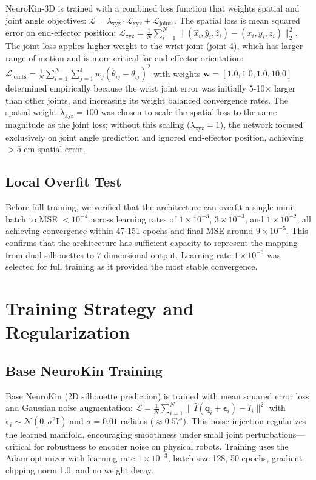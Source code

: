 \documentclass[12pt,a4paper,oneside]{report}
\begin{document}
NeuroKin-3D is trained with a combined loss function that weights spatial and joint angle objectives: $\mathcal{L} = \lambda_{\text{xyz}} \cdot \mathcal{L}_{\text{xyz}} + \mathcal{L}_{\text{joints}}$. The spatial loss is mean squared error on end-effector position: $\mathcal{L}_{\text{xyz}} = \frac{1}{N} \sum_{i=1}^{N} \|(\hat{x}_i, \hat{y}_i, \hat{z}_i) - (x_i, y_i, z_i)\|_2^2$. The joint loss applies higher weight to the wrist joint (joint 4), which has larger range of motion and is more critical for end-effector orientation: $\mathcal{L}_{\text{joints}} = \frac{1}{N} \sum_{i=1}^{N} \sum_{j=1}^{4} w_j (\hat{\theta}_{ij} - \theta_{ij})^2$ with weights $\mathbf{w} = [1.0, 1.0, 1.0, 10.0]$ determined empirically because the wrist joint error was initially 5-10$\times$ larger than other joints, and increasing its weight balanced convergence rates. The spatial weight $\lambda_{\text{xyz}} = 100$ was chosen to scale the spatial loss to the same magnitude as the joint loss; without this scaling ($\lambda_{\text{xyz}} = 1$), the network focused exclusively on joint angle prediction and ignored end-effector position, achieving $>5$ cm spatial error.

\subsection{Local Overfit Test}
\label{subsec:local_overfit_test}

Before full training, we verified that the architecture can overfit a single mini-batch to MSE $< 10^{-4}$ across learning rates of $1 \times 10^{-3}$, $3 \times 10^{-3}$, and $1 \times 10^{-2}$, all achieving convergence within 47-151 epochs and final MSE around $9 \times 10^{-5}$. This confirms that the architecture has sufficient capacity to represent the mapping from dual silhouettes to 7-dimensional output. Learning rate $1 \times 10^{-3}$ was selected for full training as it provided the most stable convergence.

\section{Training Strategy and Regularization}

\subsection{Base NeuroKin Training}
\label{subsec:base_neurokin_training}

Base NeuroKin (2D silhouette prediction) is trained with mean squared error loss and Gaussian noise augmentation: $\mathcal{L} = \frac{1}{N} \sum_{i=1}^{N} \|\hat{I}(\mathbf{q}_i + \boldsymbol{\epsilon}_i) - I_i\|^2$ with $\boldsymbol{\epsilon}_i \sim \mathcal{N}(0, \sigma^2 \mathbf{I})$ and $\sigma = 0.01$ radians ($\approx 0.57^\circ$). This noise injection regularizes the learned manifold, encouraging smoothness under small joint perturbations—critical for robustness to encoder noise on physical robots. Training uses the Adam optimizer with learning rate $1 \times 10^{-3}$, batch size 128, 50 epochs, gradient clipping norm 1.0, and no weight decay.
\end{document}
